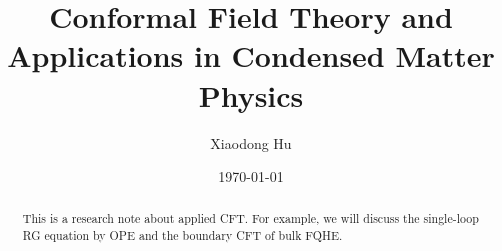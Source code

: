 \documentclass[10pt,nofootinbib]{revtex4}
\begin{document}
\title{Conformal Field Theory and Applications in Condensed Matter Physics}%

\author{Xiaodong Hu}

\date{\today}

\begin{abstract}
	This is a research note about applied CFT. For example, we will discuss the single-loop RG equation by OPE and the boundary CFT of bulk FQHE.
\end{abstract}
\maketitle
\tableofcontents
\end{document}
